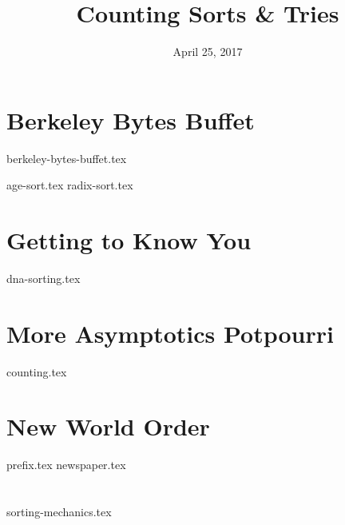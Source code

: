 \documentclass[11pt]{exam}
\title{Counting Sorts \& Tries}
\date{April 25, 2017}
\begin{document}
\maketitle

\section{Berkeley Bytes Buffet}
{berkeley-bytes-buffet.tex}
\begin{questions}
{age-sort.tex}
{radix-sort.tex}
\end{questions}

\clearpage

\section{Getting to Know You}
\begin{questions}
{dna-sorting.tex}
\end{questions}

\section{More Asymptotics Potpourri}
{counting.tex}

\section{New World Order}
\begin{questions}
{prefix.tex}
{newspaper.tex}
\end{questions}

\clearpage

\section{}
\begin{questions}
{sorting-mechanics.tex}
\end{questions}
\end{document}
